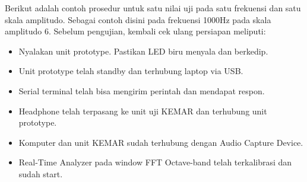 \documentclass[12pt,]{article}
\begin{document}
	Berikut adalah contoh prosedur untuk satu nilai uji pada satu frekuensi dan satu skala amplitudo.
	Sebagai contoh disini pada frekuensi 1000Hz pada skala amplitudo 6.
	Sebelum pengujian, kembali cek ulang persiapan meliputi:
	\begin{itemize}
		\item Nyalakan unit prototype. Pastikan LED biru menyala dan berkedip.
		\item Unit prototype telah standby dan terhubung laptop via USB.
		\item Serial terminal telah bisa mengirim perintah dan mendapat respon.
		\item Headphone telah terpasang ke unit uji KEMAR dan terhubung unit prototype.
		\item Komputer dan unit KEMAR sudah terhubung dengan Audio Capture Device.
		\item Real-Time Analyzer pada window FFT Octave-band telah terkalibrasi dan sudah start.
	\end{itemize}
	
\end{document}
